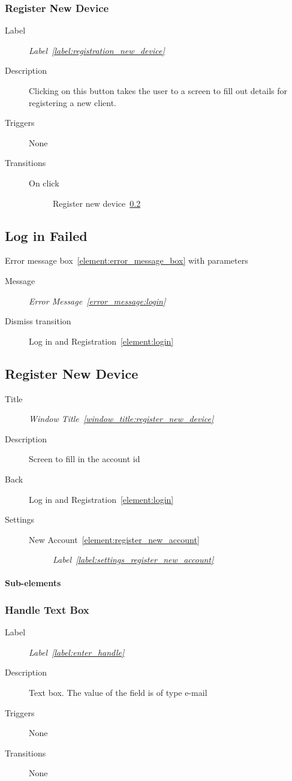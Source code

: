 \documentclass[a4paper,10pt]{article}
\newcommand{\windowTitleLabelText}{Window Title}
\newcommand{\windowTitleLabel}{window_title:}
\DeclareRobustCommand{\windowTitleRef}[1]{%
   \emph{\windowTitleLabelText~\ref{\windowTitleLabel#1}}}
\newcommand{\errorMessageLabelText}{Error Message}
\newcommand{\errorMessageLabel}{error_message:}
\DeclareRobustCommand{\errorMessageTextRef}[1]{%
   \emph{\errorMessageLabelText~\ref{\errorMessageLabel#1}}}
\newcommand{\labelLabelText}{Label}
\newcommand{\labelLabel}{label:}
\DeclareRobustCommand{\labelRef}[1]{%
   \emph{\labelLabelText~\ref{\labelLabel#1}}}
\newcommand{\elementLabel}{element:}
\DeclareRobustCommand{\element}[2]{\subsection{#1}\label{\elementLabel#2}}
\DeclareRobustCommand{\elementRef}[1]{\ref{\elementLabel#1}}
\begin{document}
\subsubsection{Register New Device}
\begin{description}
 \item[Label] \labelRef{registration_new_device}
 \item[Description] Clicking on this button takes the user to a screen to fill 
out details for registering a new client.
 \item[Triggers] None
 \item[Transitions]\mbox{}
  \begin{description}
   \item[On click] Register new device~\elementRef{register_new_device}
  \end{description}
\end{description}

\element{Log in Failed}{login_failed}

Error message box~\elementRef{error_message_box} with parameters
\begin{description}
 \item[Message] \errorMessageTextRef{login}
 \item[Dismiss transition] Log in and Registration~\elementRef{login}
\end{description}

\element{Register New Device}{register_new_device}

\begin{description}
 \item[Title] \windowTitleRef{register_new_device}
 \item[Description] Screen to fill in the account id
 \item[Back] Log in and Registration~\elementRef{login}
 \item[Settings]\mbox{}
 \begin{description}
  \item[New Account~\elementRef{register_new_account}] 
\labelRef{settings_register_new_account}
 \end{description}
\end{description}

\paragraph{Sub-elements}

\subsubsection{Handle Text Box}
\begin{description}
 \item[Label] \labelRef{enter_handle}
 \item[Description] Text box. The value of the field is of type e-mail
 \item[Triggers] None
 \item[Transitions] None
\end{description}
\end{document}
